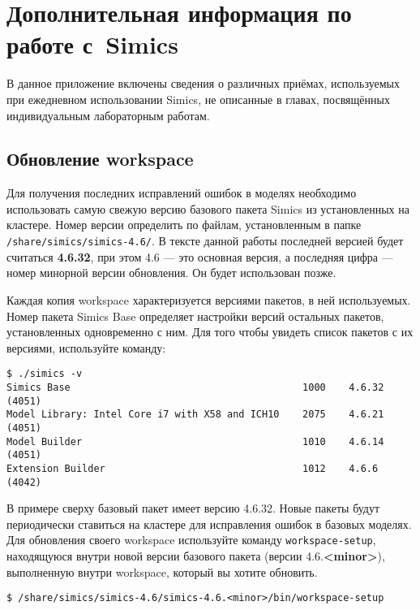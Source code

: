 \chapter{Дополнительная информация по работе с~Simics} \label{chap:append01}

В данное приложение включены сведения о различных приёмах, используемых при ежедневном использовании Simics, не описанные в главах, посвящённых индивидуальным лабораторным работам.

\section{Обновление workspace}

Для получения последних исправлений ошибок в моделях необходимо использовать самую свежую версию базового пакета Simics из  установленных на кластере. Номер версии определить по файлам, установленным в папке \texttt{/share/simics/simics-4.6/}. В тексте данной работы последней версией будет считаться \textbf{4.6.32}, при этом 4.6 --- это основная версия, а последняя цифра --- номер минорной версии обновления. Он будет использован позже.

Каждая копия workspace характеризуется версиями пакетов, в ней используемых. Номер пакета Simics Base определяет настройки версий остальных пакетов, установленных одновременно с ним. Для того чтобы увидеть список пакетов с их версиями, используйте команду:

\begin{lstlisting}
$ ./simics -v
Simics Base                                        1000    4.6.32    (4051)
Model Library: Intel Core i7 with X58 and ICH10    2075    4.6.21    (4051)
Model Builder                                      1010    4.6.14    (4051)
Extension Builder                                  1012    4.6.6     (4042)
\end{lstlisting}

В примере сверху базовый пакет имеет версию 4.6.32. Новые пакеты будут периодически ставиться на кластере для исправления ошибок в базовых моделях. Для обновления своего workspace используйте команду \texttt{workspace-setup}, находящуюся внутри новой версии базового пакета (версии 4.6.\textbf{<minor>}), выполненную внутри workspace, который вы хотите обновить.

\begin{lstlisting}
$ /share/simics/simics-4.6/simics-4.6.<minor>/bin/workspace-setup
\end{lstlisting}

